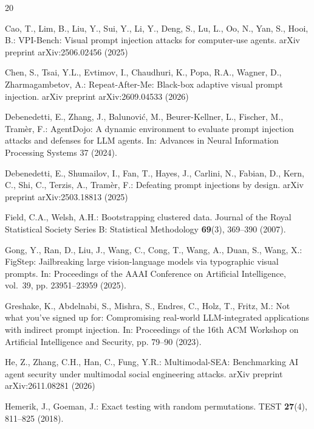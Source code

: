 \documentclass[runningheads]{llncs}
\begin{document}
\begin{thebibliography}{20}

Cao, T., Lim, B., Liu, Y., Sui, Y., Li, Y., Deng, S., Lu, L., Oo, N., Yan, S., Hooi, B.: VPI-Bench: Visual prompt injection attacks for computer-use agents. arXiv preprint arXiv:2506.02456 (2025)

Chen, S., Tsai, Y.L., Evtimov, I., Chaudhuri, K., Popa, R.A., Wagner, D., Zharmagambetov, A.: Repeat-After-Me: Black-box adaptive visual prompt injection. arXiv preprint arXiv:2609.04533 (2026)

Debenedetti, E., Zhang, J., Balunovi\'{c}, M., Beurer-Kellner, L., Fischer, M., Tram\`{e}r, F.: AgentDojo: A dynamic environment to evaluate prompt injection attacks and defenses for LLM agents. In: Advances in Neural Information Processing Systems 37 (2024). 

Debenedetti, E., Shumailov, I., Fan, T., Hayes, J., Carlini, N., Fabian, D., Kern, C., Shi, C., Terzis, A., Tram\`{e}r, F.: Defeating prompt injections by design. arXiv preprint arXiv:2503.18813 (2025)

Field, C.A., Welsh, A.H.: Bootstrapping clustered data. Journal of the Royal Statistical Society Series B: Statistical Methodology \textbf{69}(3), 369--390 (2007). 

Gong, Y., Ran, D., Liu, J., Wang, C., Cong, T., Wang, A., Duan, S., Wang, X.: FigStep: Jailbreaking large vision-language models via typographic visual prompts. In: Proceedings of the AAAI Conference on Artificial Intelligence, vol.~39, pp. 23951--23959 (2025). 

Greshake, K., Abdelnabi, S., Mishra, S., Endres, C., Holz, T., Fritz, M.: Not what you've signed up for: Compromising real-world LLM-integrated applications with indirect prompt injection. In: Proceedings of the 16th ACM Workshop on Artificial Intelligence and Security, pp. 79--90 (2023). 

He, Z., Zhang, C.H., Han, C., Fung, Y.R.: Multimodal-SEA: Benchmarking AI agent security under multimodal social engineering attacks. arXiv preprint arXiv:2611.08281 (2026)

Hemerik, J., Goeman, J.: Exact testing with random permutations. TEST \textbf{27}(4), 811--825 (2018). 


\end{thebibliography}
\end{document}
